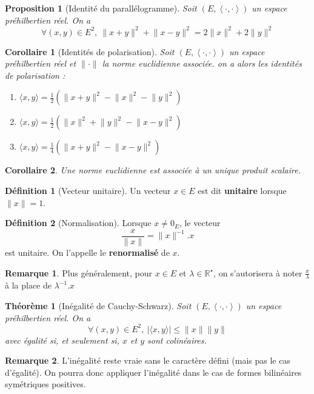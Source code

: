 \documentclass[french]{book}
\newcommand{\R}{\mathbb{R}}
\newcommand{\st}{^\star}
\newcommand{\inv}{^{-1}}
\theoremstyle{plain}
\newtheorem{thm}{Théorème}[chapter]
\newtheorem{prop}{Proposition}[chapter]
\newtheorem{cor}{Corollaire}[chapter]
\theoremstyle{definition}
\newtheorem{dfn}{Définition}[chapter]
\newtheorem{rmq}{Remarque}[chapter]
\theoremstyle{remark}
\begin{document}
\begin{prop}[Identité du parallélogramme]
	Soit $(E,\left\langle\cdot,\cdot\right\rangle)$ un espace préhilbertien réel. On a $$\forall (x,y)\in E^2,\ \lVert x+y\rVert^2+\lVert x-y\rVert^2=2\lVert x\rVert^2+2\lVert y\rVert^2$$
\end{prop}
\begin{cor}[Identités de polarisation]
	Soit $(E,\left\langle\cdot,\cdot\right\rangle)$ un espace préhilbertien réel et $\lVert\cdot\rVert$ la norme euclidienne associée. on a alors les identités de polarisation :
	\begin{enumerate}
		\item $\displaystyle \langle x,y\rangle =\frac12\left(\lVert x+y\rVert^2-\lVert x\rVert^2-\lVert y\rVert^2\right)$
		\item $\displaystyle \langle x,y\rangle =\frac12\left(\lVert x\rVert^2+\lVert y\rVert^2-\lVert x-y\rVert^2\right)$
		\item $\displaystyle \langle x,y\rangle =\frac14\left(\lVert x+y\rVert^2-\lVert x-y\rVert^2\right)$
	\end{enumerate}
\end{cor}
\begin{cor}
	Une  norme euclidienne est associée à un unique produit scalaire.
\end{cor}
\begin{dfn}[Vecteur unitaire]
	Un vecteur $x\in E$ est dit \textbf{unitaire} lorsque $\lVert x\rVert=1$.
\end{dfn}
\begin{dfn}[Normalisation]
	Lorsque $x\ne 0_E$, le vecteur $$\frac{x}{\lVert x\rVert}=\lVert x\rVert\inv.x$$ est unitaire. On l'appelle le \textbf{renormalisé} de $x$.
\end{dfn}
\begin{rmq} Plus généralement, pour $x\in E$ et $\lambda\in\R\st$, on s'autorisera à noter $\displaystyle \frac{x}{\lambda}$ à la place de $\lambda\inv.x$ \end{rmq}
\begin{thm}[Inégalité de Cauchy-Schwarz]
	Soit $(E,\left\langle\cdot,\cdot\right\rangle)$ un espace préhilbertien réel. On a $$\forall(x,y)\in E^2,\ \lvert\langle x,y\rangle\rvert \leqslant\lVert x\rVert \lVert y\rVert$$ avec égalité si, et seulement si, $x$ et $y$ sont colinéaires.
\end{thm}
\begin{rmq} L'inégalité reste vraie sans le caractère défini (mais pas le cas d'égalité). On pourra donc appliquer l'inégalité dans le cas de formes bilinéaires symétriques positives. \end{rmq}
\end{document}
